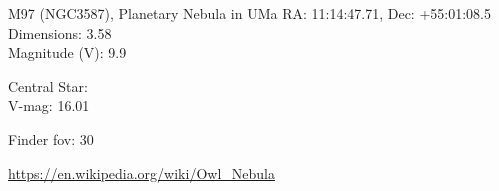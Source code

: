 \begin{block}{M97 (NGC3587), Planetary Nebula in UMa}
    RA: 11:14:47.71, Dec: +55:01:08.5 \\ 
    Dimensions: 3.58 \\ 
    Magnitude (V): 9.9


    Central Star: \\ 
      \hspace{1em}V-mag: 16.01 


    Finder fov: 30 

    \url{https://en.wikipedia.org/wiki/Owl_Nebula} 
\end{block}